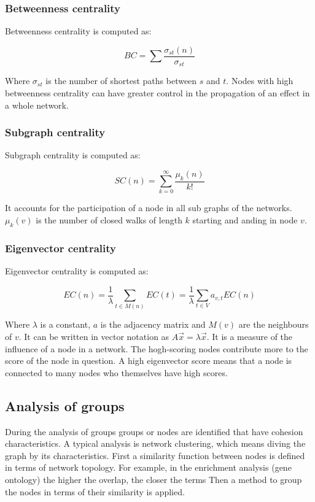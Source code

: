 		\subsubsection{Betweenness centrality}
		Betweenness centrality is computed as:

		$$BC = \sum\frac{\sigma_{st}(n)}{\sigma_{st}}$$

		Where $\sigma_{st}$ is the number of shortest paths between $s$ and $t$.
		Nodes with high betweenness centrality can have greater control in the propagation of an effect in a whole network.

		\subsubsection{Subgraph centrality}
		Subgraph centrality is computed as:

		$$SC(n) = \sum\limits_{k=0}^\infty \frac{\mu_k(n)}{k!}$$

		It accounts for the participation of a node in all sub graphs of the networks.
		$\mu_k(v)$ is the number of closed walks of length $k$ starting and anding in node $v$.

		\subsubsection{Eigenvector centrality}
		Eigenvector centrality is computed as:

		$$EC(n) = \frac{1}{\lambda}\sum\limits_{t\in M(n)} EC(t) = \frac{1}{\lambda}\sum\limits_{t\in V} a_{v,t}EC(n)$$

		Where $\lambda$ is a constant, $a$ is the adjacency matrix and $M(v)$ are the neighbours of $v$.
		It can be written in vector notation as $A\vec{x} = \lambda\vec{x}$.
		It is a measure of the influence of a node in a network.
		The hogh-scoring nodes contribute more to the score of the node in question.
		A high eigenvector score means that a node is connected to many nodes who themselves have high scores.

	\subsection{Analysis of groups}
	During the analysis of groups groups or nodes are identified that have cohesion characteristics.
	A typical analysis is network clustering, which means diving the graph by its characteristics.
	First a similarity function between nodes is defined in terms of network topology.
	For example, in the enrichment analysis (gene ontology) the higher the overlap, the closer the terms
	Then a method to group the nodes in terms of their similarity is applied.

